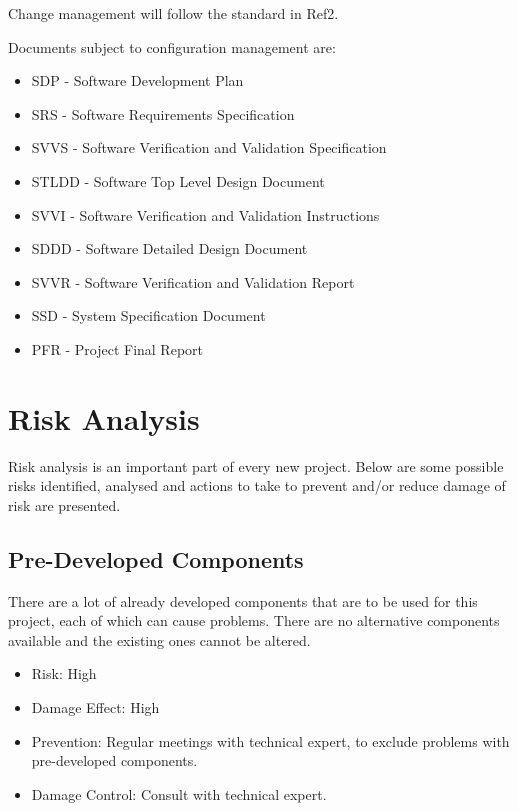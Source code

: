 \documentclass[a4paper]{article}
\begin{document}
Change management will follow the standard in Ref2.

Documents subject to configuration management are:
\begin{itemize}
\item SDP - Software Development Plan
\item SRS - Software Requirements Specification
\item SVVS - Software Verification and Validation Specification
\item STLDD - Software Top Level Design Document
\item SVVI - Software Verification and Validation Instructions
\item SDDD - Software Detailed Design Document
\item SVVR - Software Verification and Validation Report
\item SSD - System Specification Document
\item PFR - Project Final Report
\end{itemize}

\section{Risk Analysis}

Risk analysis is an important part of every new project. Below are some possible risks identified, analysed and actions to take to prevent and/or reduce damage of risk are presented.  

\subsection{Pre-Developed Components}
There are a lot of already developed components that are to be used for this project, each of which can cause problems. There are no alternative components available and the existing ones cannot be altered.
\begin{itemize}
\item Risk: High
\item Damage Effect: High
\item Prevention: Regular meetings with technical expert, to exclude problems with pre-developed components.
\item Damage Control: Consult with technical expert.
\end{itemize}
\end{document}
